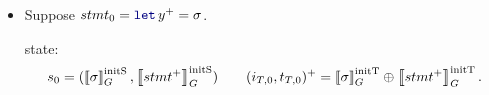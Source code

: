 \begin{skippableproof}
\begin{itemize}
\begin{itemize}
\begin{equation*}
\begin{array}{l}
\begin{array}{l}
\begin{array}{l}
\begin{array}{l}
                                                   \exists m, \, t_k \le t_m = T \wedge \gamma_m[i] = () \\
                                                   \forall m, \, t_k \le t_m < T \Rightarrow \gamma_m[i] = \bot
                                               \end{array}\right.          \\
                                        \left[\exists l, \, t_k \le t_l < T \wedge i \in \{(i_{l+1})^+\} \right]
                                        \Rightarrow \forall m, \, t_k \le t_m \le T \Rightarrow \gamma_m[i] = \bot. \\
                                    \end{array}
                                    \right.                                                                                            \\
                                \end{array}
                                \right.
                            \end{array}
                        \end{equation*}

                        We apply the induction hypothesis to state that for all statement $stmt$
                        from the block $stmt^+$ we have  holds.

                        Furthermore, because we have $K[y] \equiv O[y]$, the rule
                         ensures that the judgement
                         holds.

                  \item Suppose $stmt_0 = \decl{y^+}{\sigma}$.

                         state:
                        \begin{equation*}
                            s_0 = (\left\llbracket \sigma \right\rrbracket_G^\text{initS}, \left\llbracket stmt^+ \right\rrbracket_G^\text{initS}) \qquad
                            (i_{T, 0}, t_{T, 0})^+ = \left\llbracket \sigma \right\rrbracket_G^\text{initT} \oplus \left\llbracket stmt^+ \right\rrbracket_G^\text{initT}.
                        \end{equation*}


\end{itemize}
\end{itemize}
\end{skippableproof}
